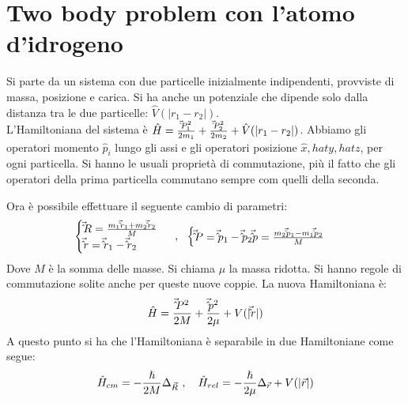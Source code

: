 \section{Two body problem con l'atomo d'idrogeno}
Si parte da un sistema con due particelle inizialmente indipendenti, provviste di massa, posizione e carica. Si ha anche un potenziale che dipende solo dalla distanza tra le due particelle: $\hat V(|r_1 - r_2|)$. \\
L'Hamiltoniana del sistema è $\hat{H} = \frac{\vec \hat P_1^2}{2m_1} + \frac{\vec \hat P_2^2}{2m_2} + \hat V(|r_1 - r_2|)$. Abbiamo gli operatori momento $\hat p_i$ lungo gli assi e gli operatori posizione $\hat x, hat y, hat z$, per ogni particella. Si hanno le usuali proprietà di commutazione, più il fatto che gli operatori della prima particella commutano sempre com quelli della seconda.

Ora è possibile effettuare il seguente cambio di parametri:
\[
\begin{cases}
    \vhat R = \frac{m_1\vhat r_1 + m_2\vhat r_2 }{M} \\
    \vhat r = \vhat r_1 - \vhat r_2
\end{cases}\ ,\ \ 
\begin{cases}
    \vhat P = \vhat p_1 - \vhat p_2
    \vhat p = \frac{m_2\vhat p_1 - m_1\vhat p_2}{M} \\
\end{cases}
\]
Dove $M$ è la somma delle masse. Si chiama $\mu$ la massa ridotta.
Si hanno regole di commutazione solite anche per queste nuove coppie. La nuova Hamiltoniana è:
\[
    \hat{H} = \frac{\vec \hat P^2}{2M} + \frac{\vec \hat p^2}{2\mu} + V(|\vec \hat r|)
\]
A questo punto si ha che l'Hamiltoniana è separabile in due Hamiltoniane come segue:
\[
    \H_{cm} = -\frac{\hslash}{2M} \Lap_{\vec R} \ , \ \ \ \H_{rel} = -\frac{\hslash}{2\mu} \Lap_{\vec r} + V(|\vec r|)
\]

